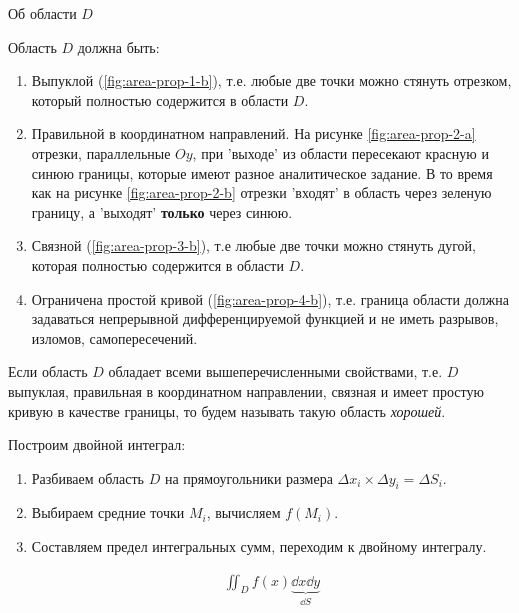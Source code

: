 
\setlength{\columnseprule}{1pt}
\begin{multicols}{2}



\columnbreak



\end{multicols}
\setlength{\columnseprule}{0pt}

\begin{remark}
  Об области \(D\)

  Область \(D\) должна быть:
  \begin{enumerate}
    \item Выпуклой (\ref{fig:area-prop-1-b}), т.е. любые две точки можно стянуть
    отрезком, который полностью содержится в области \(D\).

    \item Правильной в координатном направлений. На рисунке
    \ref{fig:area-prop-2-a} отрезки, параллельные \(Oy\), при 'выходе' из
    области пересекают красную и синюю границы, которые имеют разное
    аналитическое задание. В то время как на рисунке \ref{fig:area-prop-2-b}
    отрезки 'входят' в область через зеленую границу, а 'выходят'
    \textbf{только} через синюю.

    \item Связной (\ref{fig:area-prop-3-b}), т.е любые две точки можно стянуть
    дугой, которая полностью содержится в области \(D\).

    \item Ограничена простой кривой (\ref{fig:area-prop-4-b}), т.е. граница
    области должна задаваться непрерывной дифференцируемой функцией и не иметь
    разрывов, изломов, самопересечений.
  \end{enumerate}
\end{remark}

\begin{remark}\label{area-good-def}
  Если область \(D\) обладает всеми вышеперечисленными свойствами, т.е. \(D\)
  выпуклая, правильная в координатном направлении, связная и имеет простую
  кривую в качестве границы, то будем называть такую область \textit{хорошей}.
\end{remark}

Построим двойной интеграл:
\begin{enumerate}
  \item Разбиваем область \(D\) на прямоугольники размера
  \(\Delta x_{i} \times \Delta y_{i} = \Delta S_{i}\).

  \item Выбираем средние точки \(M_{i}\), вычисляем \(f(M_{i})\).
  
  \item Составляем предел интегральных сумм, переходим к двойному интегралу.
  
  \begin{align*}
    \iint_{D} f(x) \underbrace{\dd x \dd y}_{\dd S}
  \end{align*}
\end{enumerate}

